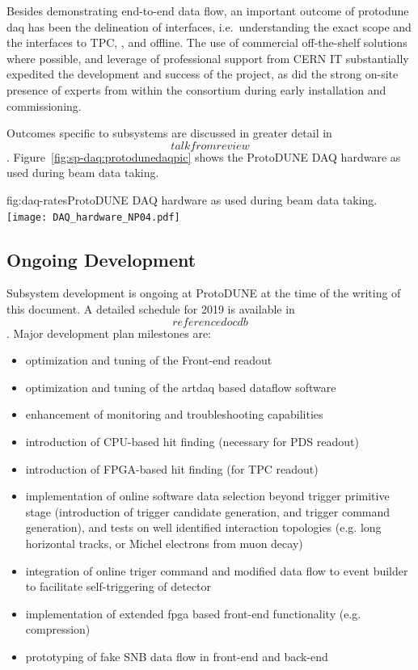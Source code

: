Besides demonstrating end-to-end data flow, an important outcome of
protodune daq has been the delineation of
interfaces, i.e.~understanding the exact  scope and the interfaces to TPC, , and offline. The use of commercial off-the-shelf solutions
where possible, and leverage of professional support from CERN IT 
substantially expedited the development and success of the project, as
did the strong on-site presence of experts from within the consortium during early installation and
commissioning. 

Outcomes specific to  subsystems are discussed in
greater detail in \[talk from review\]. Figure~\ref{fig:sp-daq:protodunedaqpic} shows the 
ProtoDUNE DAQ hardware as used during beam data taking.

\begin{dunefigure}{fig:daq-rates}{ProtoDUNE DAQ hardware as used during beam data taking. \label{fig:sp-daq:protodunedaqpic}}
  \texttt{[image: DAQ\_hardware\_NP04.pdf]}
\end{dunefigure}


\subsection{Ongoing Development}
\label{sec:sp-daq:design-validation}


Subsystem development is ongoing at ProtoDUNE at the time of the
writing of this document. A detailed schedule for 2019 is available
in \[referencedocdb\]. Major development plan milestones are:
\begin{itemize}
\item optimization and tuning of the Front-end readout
\item optimization and tuning of the artdaq based dataflow software
\item enhancement of monitoring and troubleshooting capabilities
\item introduction of CPU-based hit finding (necessary for PDS readout)
\item introduction of FPGA-based hit finding (for TPC readout)
\item implementation of online software data selection beyond trigger
primitive stage (introduction of trigger candidate generation, and
trigger command generation), and tests on well identified interaction
topologies (e.g. long horizontal tracks, or Michel electrons from muon decay)
\item integration of online triger command and modified data flow to event
builder to facilitate self-triggering of detector
\item implementation of extended fpga based front-end functionality
(e.g. compression)
\item prototyping of fake SNB data flow in front-end and back-end
\end{itemize}

